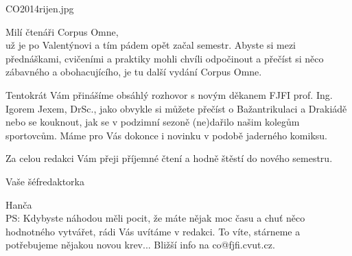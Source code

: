 \documentclass{CorpusOmne}
\begin{document}
\begin{COtitlepage}[30]{CO2014rijen.jpg}
\vfill
{}
\end{COtitlepage}


\COeditorial
\begin{COcolumn}[2]
Milí čtenáři Corpus Omne,\\[4mm]
už je po Valentýnovi a tím pádem opět začal semestr. Abyste si mezi přednáškami, cvičeními a praktiky mohli chvíli odpočinout a přečíst si něco zábavného a obohacujícího, je tu další vydání Corpus Omne.

Tentokrát Vám přinášíme obsáhlý rozhovor s novým děkanem FJFI prof. Ing. Igorem Jexem, DrSc., jako obvykle si můžete přečíst o Bažantrikulaci a Drakiádě nebo se kouknout, jak se v podzimní sezoně (ne)dařilo našim kolegům sportovcům. Máme pro Vás dokonce i novinku v podobě jaderného komiksu.

Za celou redakci Vám přeji příjemné čtení a hodně štěstí do nového semestru.

\hfill Vaše šéfredaktorka

\hfill Hanča
\\[4mm]
PS: Kdybyste náhodou měli pocit, že máte nějak moc času a chuť něco hodnotného vytvářet, rádi Vás uvítáme v redakci. To víte, stárneme a potřebujeme nějakou novou krev... Bližší info na co@fjfi.cvut.cz.
\end{COcolumn}

\COtableofcontents
\pagebreak


\begin{COcolumn}
\lipsum
{}
\end{COcolumn}

\begin{COcolumn}[2]
\lipsum[4]
\lipsum[5]
\lipsum
\lipsum
{}
\end{COcolumn}
\end{document}
